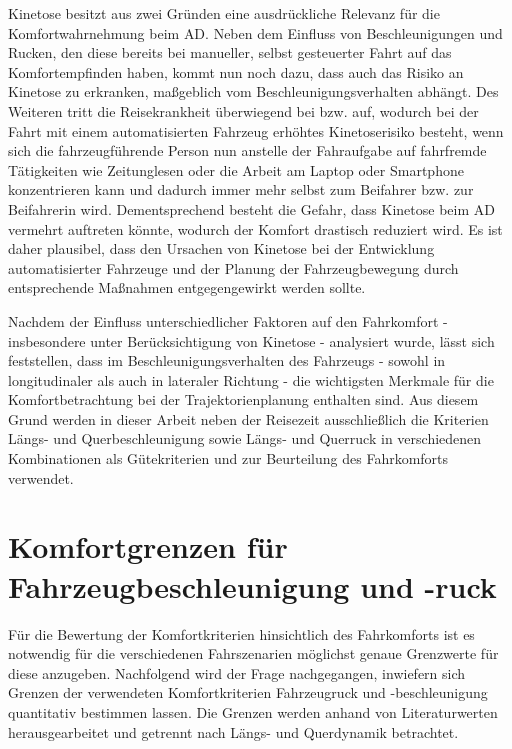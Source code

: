 Kinetose besitzt aus zwei Gründen eine ausdrückliche Relevanz für die Komfortwahrnehmung beim \gls{AD}. Neben dem Einfluss von Beschleunigungen und Rucken, den diese bereits bei manueller, selbst gesteuerter Fahrt auf das Komfortempfinden haben, kommt nun noch dazu, dass auch das Risiko an Kinetose zu erkranken, maßgeblich vom Beschleunigungsverhalten abhängt. Des Weiteren tritt die Reisekrankheit überwiegend bei  bzw.  auf, wodurch bei der Fahrt mit einem automatisierten Fahrzeug erhöhtes Kinetoserisiko besteht, wenn sich die fahrzeugführende Person nun anstelle der Fahraufgabe auf fahrfremde Tätigkeiten wie Zeitunglesen oder die Arbeit am Laptop oder Smartphone konzentrieren kann und dadurch immer mehr selbst zum Beifahrer bzw. zur Beifahrerin wird. Dementsprechend besteht die Gefahr, dass Kinetose beim \gls{AD} vermehrt auftreten könnte, wodurch der Komfort drastisch reduziert wird. Es ist daher plausibel, dass den Ursachen von Kinetose bei der Entwicklung automatisierter Fahrzeuge und der Planung der Fahrzeugbewegung durch entsprechende Maßnahmen entgegengewirkt werden sollte. 

Nachdem der Einfluss unterschiedlicher Faktoren auf den Fahrkomfort - insbesondere unter Berücksichtigung von Kinetose - analysiert wurde, lässt sich feststellen, dass im Beschleunigungsverhalten des Fahrzeugs - sowohl in longitudinaler als auch in lateraler Richtung - die wichtigsten Merkmale für die Komfortbetrachtung bei der Trajektorienplanung enthalten sind. Aus diesem Grund werden in dieser Arbeit neben der Reisezeit ausschließlich die Kriterien Längs- und Querbeschleunigung sowie Längs- und Querruck in verschiedenen Kombinationen als Gütekriterien und zur Beurteilung des Fahrkomforts verwendet. 

\section{Komfortgrenzen für Fahrzeugbeschleunigung und -ruck} \label{sec:komfortgrenzen}
Für die Bewertung der Komfortkriterien hinsichtlich des Fahrkomforts ist es notwendig für die verschiedenen Fahrszenarien möglichst genaue Grenzwerte für diese anzugeben. Nachfolgend wird der Frage nachgegangen, inwiefern sich Grenzen der verwendeten Komfortkriterien Fahrzeugruck und -beschleunigung quantitativ bestimmen lassen. Die Grenzen werden anhand von Literaturwerten herausgearbeitet und getrennt nach Längs- und Querdynamik betrachtet.


